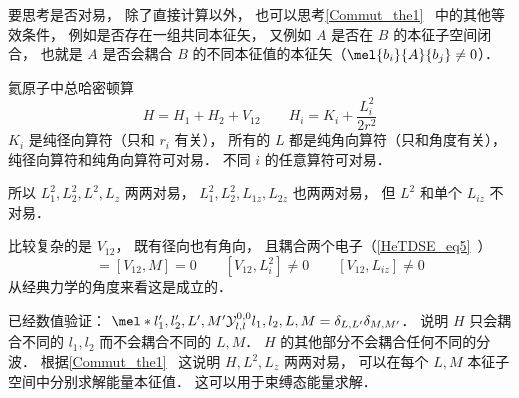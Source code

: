 
要思考是否对易， 除了直接计算以外， 也可以思考\autoref{Commut_the1}~ 中的其他等效条件， 例如是否存在一组共同本征矢， 又例如 $A$ 是否在 $B$ 的本征子空间闭合， 也就是 $A$ 是否会耦合 $B$ 的不同本征值的本征矢（$\mel{b_i}{A}{b_j} \ne 0$）．

氦原子中总哈密顿算
\begin{equation}
H = H_1 + H_2 + V_{12} \qquad H_i = K_i + \frac{L_i^2}{2r^2}
\end{equation}
$K_i$ 是纯径向算符（只和 $r_i$ 有关）， 所有的 $L$ 都是纯角向算符（只和角度有关）， 纯径向算符和纯角向算符可对易． 不同 $i$ 的任意算符可对易．

所以 $L_1^2, L_2^2, L^2, L_z$ 两两对易， $L_1^2, L_2^2, L_{1z}, L_{2z}$ 也两两对易， 但 $L^2$ 和单个 $L_{iz}$ 不对易．

比较复杂的是 $V_{12}$， 既有径向也有角向， 且耦合两个电子（\autoref{HeTDSE_eq5}~）
\begin{equation}
[V_{12}, L^2] = [V_{12}, M] = 0
\qquad
[V_{12}, L_i^2] \ne 0
\qquad
[V_{12}, L_{iz}] \ne 0
\end{equation}
从经典力学的角度来看这是成立的．

已经数值验证： $\mel*{l'_1,l'_2,L',M'}{\mathcal Y_{l,l}^{0,0}}{l_1,l_2,L,M} = \delta_{L,L'}\delta_{M,M'}$． 说明 $H$ 只会耦合不同的 $l_1,l_2$ 而不会耦合不同的 $L,M$． $H$ 的其他部分不会耦合任何不同的分波． 根据\autoref{Commut_the1}~ 这说明 $H,L^2,L_z$ 两两对易， 可以在每个 $L,M$ 本征子空间中分别求解能量本征值． 这可以用于束缚态能量求解．
